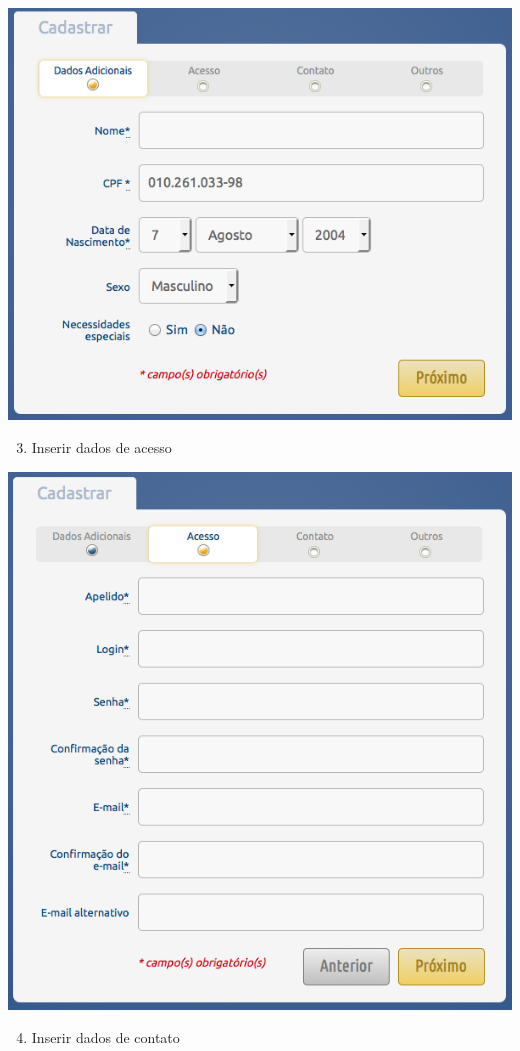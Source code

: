 \documentclass[letterpaper,10pt,english]{sphinxmanual}
\begin{document}
{\hfill\includegraphics{register-02.png}\hfill}
\begin{enumerate}
\setcounter{enumi}{2}
\item {} 
Inserir dados de acesso

\end{enumerate}

{\hfill\includegraphics{register-03.png}\hfill}
\begin{enumerate}
\setcounter{enumi}{3}
\item {} 
Inserir dados de contato

\end{enumerate}
\end{document}
